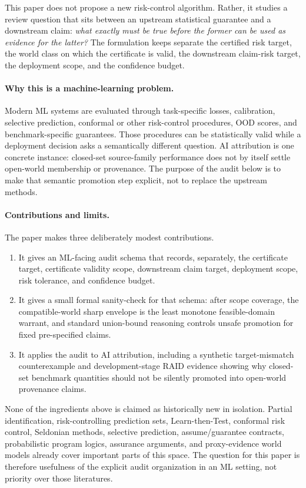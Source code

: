 \documentclass[10pt]{article}
\begin{document}
This paper does not propose a new risk-control algorithm.  Rather, it studies a
review question that sits between an upstream statistical guarantee and a
downstream claim: \emph{what exactly must be true before the former can be used
as evidence for the latter?}  The formulation keeps separate the certified
risk target, the world class on which the certificate is valid, the downstream
claim-risk target, the deployment scope, and the confidence budget.

\paragraph{Why this is a machine-learning problem.}
Modern ML systems are evaluated through task-specific losses, calibration,
selective prediction, conformal or other risk-control procedures, OOD scores,
and benchmark-specific guarantees.  Those procedures can be statistically
valid while a deployment decision asks a semantically different question.
AI attribution is one concrete instance: closed-set source-family performance
does not by itself settle open-world membership or provenance.  The purpose of
the audit below is to make that semantic promotion step explicit, not to
replace the upstream methods.

\paragraph{Contributions and limits.}
The paper makes three deliberately modest contributions.
\begin{enumerate}[label=(\arabic*)]
\item It gives an ML-facing audit schema that records, separately, the
certificate target, certificate validity scope, downstream claim target,
deployment scope, risk tolerance, and confidence budget.
\item It gives a small formal sanity-check for that schema: after scope
coverage, the compatible-world sharp envelope is the least monotone
feasible-domain warrant, and standard union-bound reasoning controls unsafe
promotion for fixed pre-specified claims.
\item It applies the audit to AI attribution, including a synthetic
target-mismatch counterexample and development-stage RAID evidence showing why
closed-set benchmark quantities should not be silently promoted into
open-world provenance claims.
\end{enumerate}
None of the ingredients above is claimed as historically new in isolation.
Partial identification, risk-controlling prediction sets, Learn-then-Test,
conformal risk control, Seldonian methods, selective prediction,
assume/guarantee contracts, probabilistic program logics, assurance arguments,
and proxy-evidence world models already cover important parts of this space.
The question for this paper is therefore usefulness of the explicit audit
organization in an ML setting, not priority over those literatures.
\end{document}
